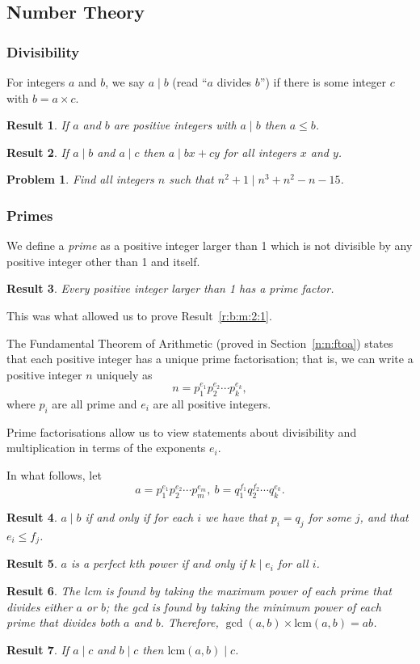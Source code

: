 \documentclass{amsart}
\newtheorem{problem}{Problem}[subsubsection]
\newtheorem{result}{Result}[subsubsection]
\newcommand\lcm{\text{lcm}}
\begin{document}
\subsection{Number Theory}
\subsubsection{Divisibility}
  For integers $a$ and $b$, we say $a\mid b$ (read ``$a$ divides
  $b$'') if there is some integer $c$ with $b=a\times c$.
\begin{result}{\label{r:b:n:d:1}}
    If $a$ and $b$ are positive integers with $a\mid b$ then
      $a\le b$.
\end{result}
\begin{result}{\label{r:b:n:d:2}}
    If $a\mid b$ and $a\mid c$ then $a\mid bx+cy$ for all
      integers $x$ and $y$.
\end{result}
\begin{problem}{\label{p:b:n:d:1}}
    Find all integers $n$ such that $n^2+1\mid n^3+n^2-n-15$.
\end{problem}
\subsubsection{Primes}
  We define a \emph{prime} as a positive integer larger than 1 which is not
  divisible by any positive integer other than 1 and itself.
\begin{result}{\label{r:b:n:p:1}}
  Every positive integer larger than 1 has a prime factor.
\end{result}
This was what allowed us to prove Result~\ref{r:b:m:2:1}.

  The Fundamental Theorem of Arithmetic (proved in Section~\ref{n:n:ftoa})
  states that each positive integer has a unique prime factorisation; that is,
  we can write a positive integer $n$ uniquely as
  \[n=p_1^{e_1}p_2^{e_2}\cdots p_k^{e_k},\]
  where $p_i$ are all prime and $e_i$ are all positive integers.

  Prime factorisations allow us to view statements about divisibility and
  multiplication in terms of the exponents $e_i$.

  In what follows, let 
  \[a=p_1^{e_1}p_2^{e_2}\cdots p_m^{e_m},\
        b=q_1^{f_1}q_2^{f_2}\cdots q_k^{e_k}.\]
\begin{result}{\label{r:b:n:p:2}}
    $a\mid b$ if and only if for each $i$ we have that $p_i=q_j$
      for some $j$, and that $e_i\le f_j$.
\end{result}
\begin{result}{\label{r:b:n:p:3}}
    $a$ is a perfect $k$th power if and only if $k\mid e_i$ for all $i$.
\end{result}
\begin{result}{\label{r:b:n:p:4}}
    The lcm is found by taking the maximum power of each prime that
      divides either $a$ or $b$; the gcd is found by taking the minimum power of
      each prime that divides both $a$ and $b$. Therefore, 
    $\gcd(a,b)\times\lcm(a,b)=ab$.
\end{result}
\begin{result}{\label{r:b:n:p:5}}
    If $a\mid c$ and $b\mid c$ then $\lcm(a,b)\mid c$.
\end{result}
\end{document}
